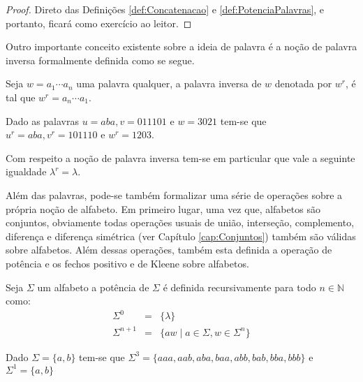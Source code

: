\begin{proof}
	Direto das Definições \ref{def:Concatenacao} e \ref{def:PotenciaPalavras}, e portanto, ficará como exercício ao leitor.
\end{proof}

Outro importante conceito existente sobre a ideia de palavra é a noção de palavra inversa formalmente definida como se segue.

\begin{definition}\label{def:PalavraInversa}
	\cite{valdi2016master} Seja $w = a_1\cdots a_n$ uma palavra qualquer, a palavra inversa de $w$ denotada por $w^r$, é tal que $w^r = a_n\cdots a_1$. 
\end{definition}

\begin{exem}
	Dado as palavras $u = aba, v = 011101$ e $w = 3021$ tem-se que $u^r = aba, v^r = 101110$ e $w^r = 1203$.
\end{exem}

\begin{rema}
	Com respeito a noção de palavra inversa tem-se em particular que vale a seguinte igualdade $\lambda^r = \lambda$.
\end{rema}

Além das palavras, pode-se também formalizar uma série de operações sobre a própria noção de alfabeto. Em primeiro lugar, uma vez que,  alfabetos são conjuntos, obviamente todas operações usuais de união, interseção, complemento, diferença e diferença simétrica (ver Capítulo \ref{cap:Conjuntos}) também são válidas sobre alfabetos. Além dessas operações, também esta definida a operação de potência e os fechos positivo e de Kleene sobre alfabetos.

\begin{definition}\label{def:PotenciaAlfabeto}
	\cite{benjaLivro2010} Seja $\Sigma$ um alfabeto a potência de $\Sigma$ é definida recursivamente para todo $n \in \mathbb{N}$ como:
	\begin{eqnarray}
		\Sigma^0 & = & \{\lambda\}\\
		\Sigma^{n+1} & = & \{aw \mid a \in \Sigma, w \in \Sigma^{n}\}
	\end{eqnarray}
\end{definition} 

\begin{exem}
	Dado $\Sigma = \{a, b\}$ tem-se que $\Sigma^3 = \{aaa, aab, aba, baa, abb, bab, bba, bbb\}$ e $\Sigma^1 = \{a, b\}$
\end{exem}

